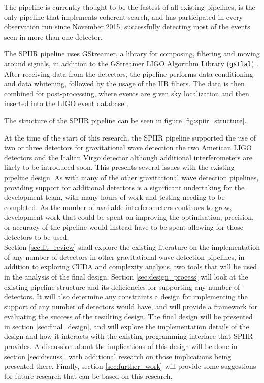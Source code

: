 \documentclass{article}
\begin{document}
The pipeline is currently thought to be the fastest of all existing pipelines, is the only pipeline that implements coherent search, and has participated in every observation run since November 2015, successfully detecting most of the events seen in more than one detector.

The SPIIR pipeline uses GStreamer, a library for composing, filtering and moving around signals, in addition to the GStreamer LIGO Algorithm Library (\texttt{gstlal}) \cite{gstlal}.
After receiving data from the detectors, the pipeline performs data conditioning and data whitening, followed by the usage of the IIR filters.
The data is then combined for post-processing, where events are given sky localization and then inserted into the LIGO event database \cite{SPIIRGPU2018}.

The structure of the SPIIR pipeline can be seen in figure \ref{fig:spiir_structure}.

At the time of the start of this research, the SPIIR pipeline supported the use of two or three detectors for gravitational wave detection \textemdash{} the two American LIGO detectors and the Italian Virgo detector \textemdash{} although additional interferometers are likely to be introduced soon.
This presents several issues with the existing pipeline design.
As with many of the other gravitational wave detection pipelines, providing support for additional detectors is a significant undertaking for the development team, with many hours of work and testing needing to be completed.
As the number of available interferometers continues to grow, development work that could be spent on improving the optimisation, precision, or accuracy of the pipeline would instead have to be spent allowing for those detectors to be used.
\\

Section \ref{sec:lit_review} shall explore the existing literature on the implementation of any number of detectors in other gravitational wave detection pipelines, in addition to exploring CUDA and complexity analysis, two tools that will be used in the analysis of the final design.
Section \ref{sec:design_process} will look at the existing pipeline structure and its deficiencies for supporting any number of detectors.
It will also determine any constraints a design for implementing the support of any number of detectors would have, and will provide a framework for evaluating the success of the resulting design.
The final design will be presented in section \ref{sec:final_design}, and will explore the implementation details of the design and how it interacts with the existing programming interface that SPIIR provides.
A discussion about the implications of this design will be done in section \ref{sec:discuss}, with additional research on those implications being presented there.
Finally, section \ref{sec:further_work} will provide some suggestions for future research that can be based on this research.
\end{document}
